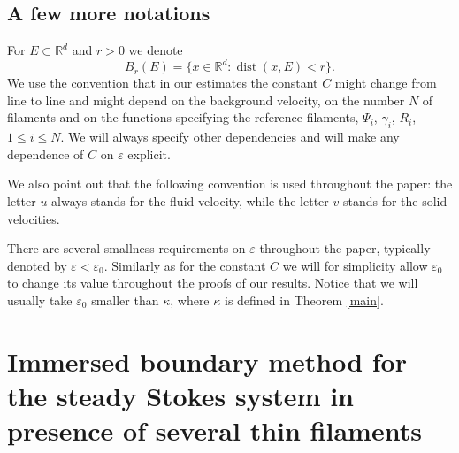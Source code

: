 \documentclass[10pt]{amsart}
\newcommand{\R}{\mathbb{R}}
\let\eps\varepsilon
\DeclareMathOperator{\dist}{dist}
\theoremstyle{definition}
\theoremstyle{remark}
\begin{document}
\subsection{A few more notations}
For $E \subset \R^d$ and $r>0$ we denote
\begin{equation}
B_r(E) = \{ x \in \R^d : \dist(x,E) < r \}.
\end{equation}
We use the convention that in our estimates the constant $C$ might change from line to line and might depend on the background velocity, on the number $N$ of filaments and on the functions specifying the reference filaments, \ie $\Psi_i$, $\gamma_i$, $R_i$, $1 \leq i \leq N$.
We will always specify other dependencies and will make any dependence of $C$ on $\eps$ explicit.

We also point out that the following convention is used throughout the paper: the letter $u$ always stands for the fluid velocity, while the letter $v$ stands for the solid velocities.

There are several smallness requirements on $\eps$ throughout the paper, typically denoted by $\eps < \eps_0$. Similarly as for the constant $C$ we will for simplicity
allow $\eps_0$ to change its value throughout the proofs of our results. Notice that we will usually take $\eps_0$ smaller than $\kappa$, where $\kappa$ is defined in Theorem \ref{main}.

\section{Immersed boundary method for the steady Stokes system in presence of several thin filaments}
\label{sec:singularity.method}
\end{document}
